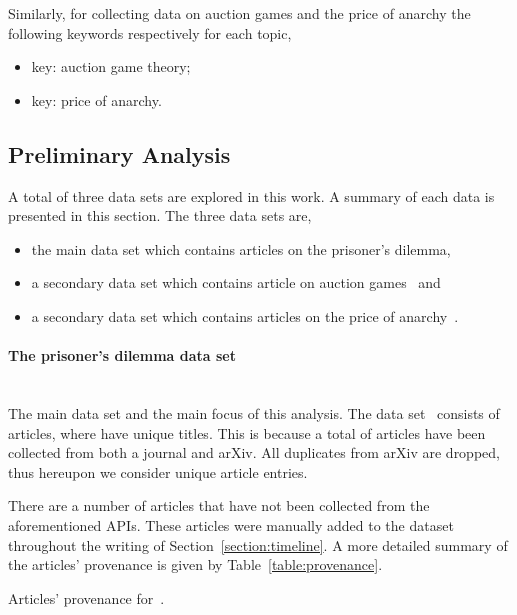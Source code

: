 \documentclass{article}
\newcommand{\totalarticles}{}
\newcommand{\uniquetitles}{}
\newcommand{\numberofduplicates}{}
\newcommand{\manual}{}
\begin{document}
Similarly, for collecting data on auction games and the price of anarchy the
following keywords respectively for each topic,

\begin{itemize}
    \item key: auction game theory;
    \item key: price of anarchy.
\end{itemize}

\subsection{Preliminary Analysis}

A total of three data sets are explored in this work. A summary of each data is
presented in this section. The three data sets are,

\begin{itemize}
    \item the main data set which contains articles on the prisoner's dilemma,~\cite{}
    \item a secondary data set which contains article on auction games~\cite{} and
    \item a secondary data set which contains articles on the price of anarchy~\cite{}.
\end{itemize}

\paragraph{The prisoner's dilemma data set}
\mbox{ }\\

The main data set and the main focus of this analysis. The data set~\cite{}
consists of \totalarticles articles, where \uniquetitles have unique titles.
This is because a total of \numberofduplicates articles have been collected from
both a journal and arXiv. All duplicates from arXiv are dropped, thus hereupon
we consider \uniquetitles unique article entries.

There are a number of \manual articles that have not been collected from the
aforementioned APIs. These articles were manually added to the dataset throughout
the writing of Section~\ref{section:timeline}. A more detailed summary of the 
articles' provenance is given by Table~\ref{table:provenance}.

\begin{table}[!hbtp]
    \begin{center}
    
    \end{center}
    \caption{Articles' provenance for~\cite{}.}
    \label{table:provenance}
\end{table}
\end{document}

